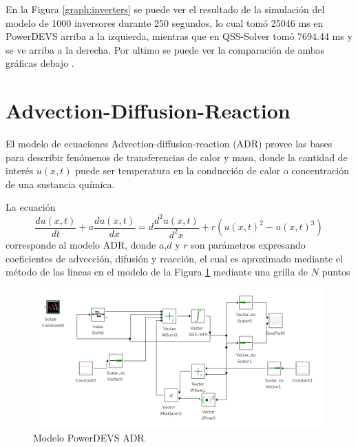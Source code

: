 En la Figura \ref{graph:inverters} se puede ver el resultado de la simulación del modelo de 1000 inversores durante 250 segundos, lo cual tomó 25046 ms en 
	PowerDEVS arriba a la izquierda, mientras que en QSS-Solver tomó 7694.44 ms y se ve arriba a la derecha. Por ultimo se puede ver la comparación de 
	ambas gráficas debajo	.	
\section{Advection-Diffusion-Reaction}
	El modelo de ecuaciones Advection-diffusion-reaction (ADR) provee las bases para describir fenómenos de transferencias de calor y masa, donde la cantidad de interés $u(x,t)$ puede ser temperatura en la conducción de calor o concentración de una sustancia química.

La ecuación 
\begin{equation*}
\frac{du(x,t)}{dt} + a \frac{du(x,t)}{dx} = d\frac{d^2u(x,t)}{d^2x} + r(u(x,t)^2 - u(x,t)^3)
\end{equation*}
corresponde al modelo ADR, donde $a$,$d$ y $r$ son parámetros expresando coeficientes de advección, difusión y reacción, 
el cual es aproximado mediante el método de las lineas \cite{BKP13} en el modelo de la Figura \ref{model:adr} mediante una grilla de $N$ puntos

\begin{figure}[H]
 \includegraphics[width=0.75\linewidth]{adr-pwd}
\caption{Modelo PowerDEVS ADR}\label{model:adr}
\end{figure}

